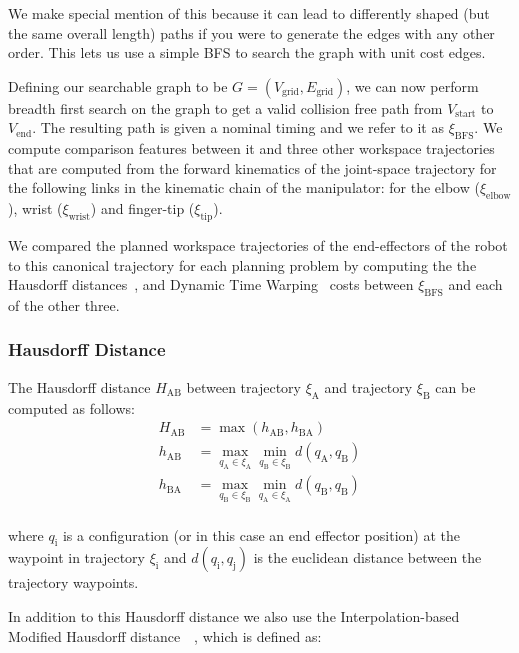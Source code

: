 \documentclass[letterpaper, 10 pt, conference]{ieeeconf}  %
\begin{document}
We make special mention of this because it can lead to differently shaped (but the same overall length) paths if you were to generate the edges with any other order. This lets us use a simple BFS to search the graph with unit cost edges.

Defining our searchable graph to be $G=(V_\text{grid}, E_\text{grid})$, we can now perform breadth first search on the graph to get a valid collision free path from $V_\text{start}$ to $V_\text{end}$. The resulting path is given a nominal timing and we refer to it as $\xi_{\text{BFS}}$. We compute comparison features between it and three other workspace trajectories that are computed from the forward kinematics of the joint-space trajectory for the following links in the kinematic chain of the manipulator: for the elbow ($\xi_\text{elbow}$), wrist ($\xi_\text{wrist}$) and finger-tip ($\xi_\text{tip}$).

We compared the planned workspace trajectories of the end-effectors of the robot to this canonical trajectory for each planning problem by computing the the Hausdorff distances~\cite{dubuisson1994modified}, and Dynamic Time Warping~\cite{senin2008dynamic} costs between $\xi_{\text{BFS}}$ and each of the other three.

\subsubsection{Hausdorff Distance}

The Hausdorff distance $H_\text{AB}$ between trajectory $\xi_\text{A}$ and trajectory $\xi_\text{B}$ can be computed as follows:
\begin{equation}
\begin{aligned}
H_\text{AB} &= \max (h_{\text{AB}}, h_{\text{BA}}) \\
h_{\text{AB}} &= \max_{q_\text{A} \in \xi_\text{A}} \min_{q_\text{B} \in \xi_\text{B}} d(q_\text{A}, q_\text{B})\\
h_{\text{BA}} &= \max_{q_\text{B} \in \xi_\text{B}} \min_{q_\text{A} \in \xi_\text{A}} d(q_\text{B}, q_\text{B})\\
\end{aligned}
\end{equation}

where $q_\text{i}$ is a configuration (or in this case an end effector position) at the waypoint in trajectory $\xi_\text{i}$ and $d(q_\text{i}, q_\text{j})$ is the euclidean distance between the trajectory waypoints.

In addition to this Hausdorff distance we also use the Interpolation-based Modified Hausdorff distance~\cite{dubuisson1994modified}~\cite{chen2013dynamic}, which is defined as:
\end{document}
